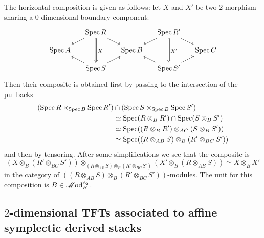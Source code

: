 The horizontal composition is given as follows: let $X$ and $X'$ be two $2$-morphism sharing a $0$-dimensional boundary component:
\begin{equation*}
	\begin{tikzcd}[row sep = small, column sep = small]
		& \Spec R \ar[dd, "X", Rightarrow] \ar[dl] \ar[dr] & & \Spec R' \ar[dd, "X'", Rightarrow] \ar[dl] \ar[dr] & \\
		\Spec A & & \Spec B & & \Spec C \\
		& \Spec S \ar[ul] \ar[ur] & & \Spec S' \ar[ul] \ar[ur] &
	\end{tikzcd}
\end{equation*}
Then their composite is obtained first by passing to the intersection of the pullbacks
\begin{align*}
	(\operatorname{Spec} R \times_{\operatorname{Spec} B} \operatorname{Spec} R') & \cap (\operatorname{Spec} S \times_{\operatorname{Spec} B} \operatorname{Spec} S') \\
	& \simeq \operatorname{Spec} (R \otimes_B R') \cap \operatorname{Spec} (S \otimes_B S') \\
	& \simeq \operatorname{Spec} ((R \otimes_B R') \otimes_{AC} (S \otimes_B S')) \\
	& \simeq \operatorname{Spec} ((R \otimes_{AB} S) \otimes_{B} (R' \otimes_{BC} S'))
\end{align*}
and then by tensoring. After some simplifications we see that the composite is
\begin{equation*}
	(X \otimes_B (R' \otimes_{BC} S')) \otimes_{(R \otimes_{AB} S) \otimes_{B} (R' \otimes_{BC} S')} (X' \otimes_B (R \otimes_{AB} S)) \simeq X \otimes_B X'
\end{equation*}
in the category of $((R \otimes_{AB} S) \otimes_{B} (R' \otimes_{BC} S'))$-modules. The unit for this composition is $B \in \mathscr{M}\mathrm{od}^{\mathbb{Z}_2}_{B}$.

\subsection{$2$-dimensional TFTs associated to affine symplectic derived stacks}

